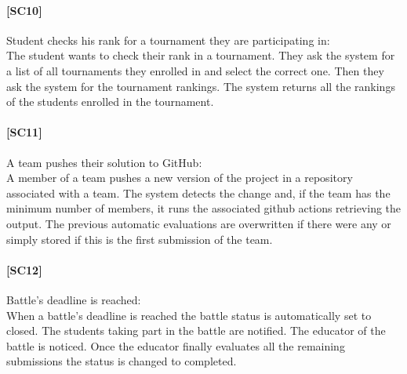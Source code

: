 \documentclass{article}
\begin{document}
\paragraph{[SC10]}Student checks his rank for a tournament they are participating in:\\
The student wants to check their rank in a tournament. They ask the system for a list of all tournaments they enrolled in and select the correct one. Then they ask the system for the tournament rankings. The system returns all the rankings of the students enrolled in the tournament.

\paragraph{[SC11]}A team pushes their solution to GitHub:\\
A member of a team pushes a new version of the project in a repository associated with a team. The system detects the change and, if the team has the minimum number of members, it runs the associated github actions retrieving the output. The previous automatic evaluations are overwritten if there were any or simply stored if this is the first submission of the team.

\paragraph{[SC12]}Battle’s deadline is reached:\\
When a battle’s deadline is reached the battle status is automatically set to closed. The students taking part in the battle are notified. The educator of the battle is noticed. Once the educator finally evaluates all the remaining submissions the status is changed to completed.
\end{document}
